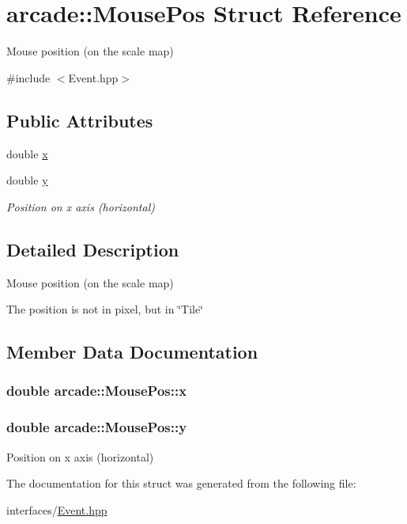 \hypertarget{structarcade_1_1_mouse_pos}{\section{arcade\-:\-:Mouse\-Pos Struct Reference}
\label{structarcade_1_1_mouse_pos}
}


Mouse position (on the scale map)  




{\ttfamily \#include $<$Event.\-hpp$>$}

\subsection*{Public Attributes}
\begin{DoxyCompactItemize}
\item 
double \hyperlink{structarcade_1_1_mouse_pos_a0baa5eab2ede9028abdfa46dfbf3b901}{x}
\item 
double \hyperlink{structarcade_1_1_mouse_pos_a6737b813beae9a70aa6f7cbfc90154a6}{y}
\begin{DoxyCompactList}\small\item\em Position on x axis (horizontal) \end{DoxyCompactList}\end{DoxyCompactItemize}


\subsection{Detailed Description}
Mouse position (on the scale map) 

The position is not in pixel, but in \char`\"{}\-Tile\char`\"{} 

\subsection{Member Data Documentation}
\hypertarget{structarcade_1_1_mouse_pos_a0baa5eab2ede9028abdfa46dfbf3b901}{
\subsubsection[{x}]{\setlength{\rightskip}{0pt plus 5cm}double arcade\-::\-Mouse\-Pos\-::x}}\label{structarcade_1_1_mouse_pos_a0baa5eab2ede9028abdfa46dfbf3b901}
\hypertarget{structarcade_1_1_mouse_pos_a6737b813beae9a70aa6f7cbfc90154a6}{
\subsubsection[{y}]{\setlength{\rightskip}{0pt plus 5cm}double arcade\-::\-Mouse\-Pos\-::y}}\label{structarcade_1_1_mouse_pos_a6737b813beae9a70aa6f7cbfc90154a6}


Position on x axis (horizontal) 



The documentation for this struct was generated from the following file\-:\begin{DoxyCompactItemize}
\item 
interfaces/\hyperlink{interfaces_2_event_8hpp}{Event.\-hpp}\end{DoxyCompactItemize}
